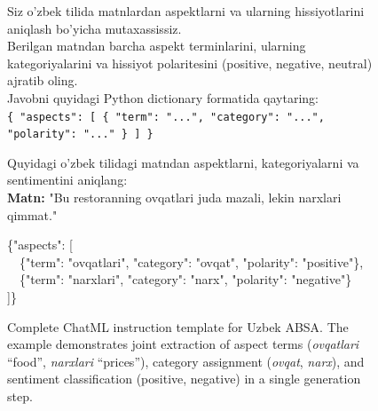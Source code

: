 \documentclass[computers,article,submit,pdftex,moreauthors]{Definitions/mdpi}
\begin{document}
\begin{figure}[t]
\centering
\begin{minipage}{0.95\textwidth}

\begin{tcolorbox}[enhanced, colback=red!5!white, colframe=red!75!black, 
  title=\texttt{<|im\_start|>system}, fonttitle=\bfseries, 
  attach boxed title to top left={yshift=-2mm, xshift=5mm},
  boxed title style={colback=red!75!black}]
\footnotesize
Siz o'zbek tilida matnlardan aspektlarni va ularning hissiyotlarini aniqlash bo'yicha mutaxassissiz.\\
Berilgan matndan barcha aspekt terminlarini, ularning kategoriyalarini va hissiyot polaritesini (positive, negative, neutral) ajratib oling.\\
Javobni quyidagi Python dictionary formatida qaytaring:\\
\texttt{\{ "aspects": [ \{ "term": "...", "category": "...", "polarity": "..." \} ] \}}
\end{tcolorbox}

\vspace{-2mm}

\begin{tcolorbox}[enhanced, colback=blue!5!white, colframe=blue!75!black, 
  title=\texttt{<|im\_start|>user}, fonttitle=\bfseries, 
  attach boxed title to top left={yshift=-2mm, xshift=5mm},
  boxed title style={colback=blue!75!black}]
\footnotesize
Quyidagi o'zbek tilidagi matndan aspektlarni, kategoriyalarni va sentimentini aniqlang:\\
\textbf{Matn:} "Bu restoranning ovqatlari juda mazali, lekin narxlari qimmat."
\end{tcolorbox}

\vspace{-2mm}

\begin{tcolorbox}[enhanced, colback=green!5!white, colframe=green!50!black, 
  title=\texttt{<|im\_start|>assistant}, fonttitle=\bfseries, 
  attach boxed title to top left={yshift=-2mm, xshift=5mm},
  boxed title style={colback=green!50!black}]
\footnotesize\ttfamily
\{"aspects": [\\
\ \ \{"term": "ovqatlari", "category": "ovqat", "polarity": "positive"\},\\
\ \ \{"term": "narxlari", "category": "narx", "polarity": "negative"\}\\
]\}
\end{tcolorbox}

\end{minipage}
\caption{Complete ChatML instruction template for Uzbek ABSA. The example demonstrates joint extraction of aspect terms (\textit{ovqatlari} ``food'', \textit{narxlari} ``prices''), category assignment (\textit{ovqat}, \textit{narx}), and sentiment classification (positive, negative) in a single generation step.}
\label{fig:instruction_example_ui}
\end{figure}
\end{document}
